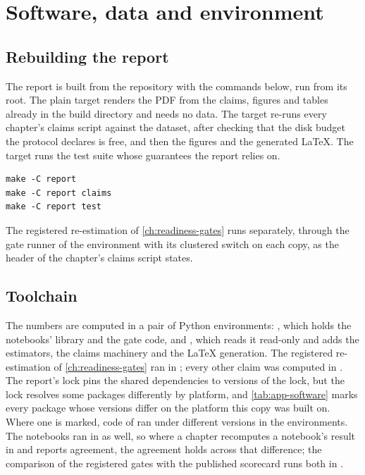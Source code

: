\chapter{Software, data and environment}\label{app:software}

\section{Rebuilding the report}

The report is built from the repository with the commands below, run from its root. The plain target renders the PDF from the
claims, figures and tables already in the build directory and needs no data. The  target re-runs every
chapter's claims script against the dataset, after checking that the disk budget the protocol declares is free, and
then the figures and the generated LaTeX. The  target runs the test suite whose guarantees the report
relies on.
\begin{verbatim}
make -C report
make -C report claims
make -C report test
\end{verbatim}
The registered re-estimation of \cref{ch:readiness-gates} runs separately, through the gate runner of the
 environment with its clustered switch on each copy, as the header of the chapter's claims script states.

\section{Toolchain}

The numbers are computed in a pair of Python environments: , which holds the notebooks' library and the gate
code, and , which reads it read-only and adds the estimators, the claims machinery and the LaTeX
generation. The registered re-estimation of \cref{ch:readiness-gates} ran in ; every other claim was
computed in . The report's lock pins the shared dependencies to versions of the  lock, but
the  lock resolves some packages differently by platform, and \cref{tab:app-software} marks every package
whose versions differ on the platform this copy was built on. Where one is marked, code of  ran under
different versions in the environments. The notebooks ran in  as well, so where a chapter recomputes a
notebook's result in  and reports agreement, the agreement holds across that difference; the comparison
of the registered gates with the published scorecard runs both in .

